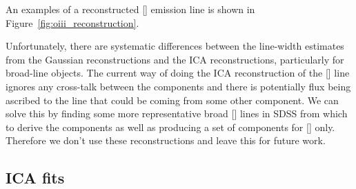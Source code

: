 An examples of a reconstructed [] emission line is shown in Figure~\ref{fig:oiii_reconstruction}. 

Unfortunately, there are systematic differences between the line-width estimates from the Gaussian reconstructions and the ICA reconstructions, particularly for broad-line objects.
The current way of doing the ICA reconstruction of the [] line ignores any cross-talk between the components and there is potentially flux being ascribed to the line that could be coming from some other component. 
We can solve this by finding some more representative broad [] lines in \ac{SDSS} from which to derive the components as well as producing a set of components for [] only.
Therefore we don't use these reconstructions and leave this for future work. 

\subsection{\ac{ICA} fits}

